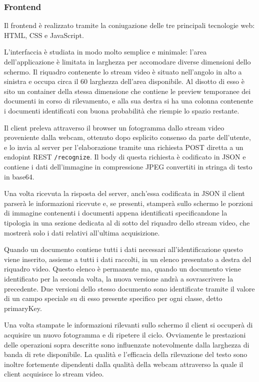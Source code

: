 \documentclass[12pt,a4paper]{article}
\begin{document}
\subsubsection{Frontend}

Il frontend è realizzato tramite la coniugazione delle tre principali
tecnologie web: HTML, CSS e JavaScript.

L'interfaccia è studiata in modo molto semplice e minimale: l'area
dell'applicazione è limitata in larghezza per accomodare diverse
dimensioni dello schermo. Il riquadro contenente lo stream video è
situato nell'angolo in alto a sinistra e occupa circa il 60%
larghezza dell'area disponibile. Al disotto di esso è sito un container
della stessa dimensione che contiene le preview temporanee dei documenti
in corso di rilevamento, e alla sua destra si ha una colonna contenente
i documenti identificati con buona probabilità che riempie lo spazio
restante.

Il client preleva attraverso il browser un fotogramma dallo stream video
proveniente dalla webcam, ottenuto dopo esplicito consenso da parte
dell'utente, e lo invia al server per l'elaborazione tramite una
richiesta POST diretta a un endopint REST \texttt{/recognize}. Il body
di questa richiesta è codificato in JSON e contiene i dati dell'immagine
in compressione JPEG convertiti in stringa di testo in base64.

Una volta ricevuta la risposta del server, anch'essa codificata in JSON
il client parserà le informazioni ricevute e, se presenti, stamperà
sullo schermo le porzioni di immagine contenenti i documenti appena
identificati specificandone la tipologia in una sezione dedicata al di
sotto del riquadro dello stream video, che mostrerà solo i dati relativi
all'ultima acquisizione.

Quando un documento contiene tutti i dati necessari all'identificazione
questo viene inserito, assieme a tutti i dati raccolti, in un elenco
presentato a destra del riquadro video. Questo elenco è permanente ma,
quando un documento viene identificato per la seconda volta, la nuova
versione andrà a sovrascrivere la precedente. Due versioni dello stesso
documento sono identificate tramite il valore di un campo speciale su di
esso presente specifico per ogni classe, detto primaryKey.

Una volta stampate le informazioni rilevanti sullo schermo il client si
occuperà di acquisire un nuovo fotogramma e di ripetere il ciclo.
Ovviamente le prestazioni delle operazioni sopra descritte sono
influenzate notevolmente dalla larghezza di banda di rete disponibile.
La qualità e l'efficacia della rilevazione del testo sono inoltre
fortemente dipendenti dalla qualità della webcam attraverso la quale il
client acquisisce lo stream video.
\end{document}
